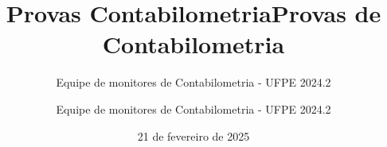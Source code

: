\documentclass[brazilian,a4paper,article,12pt]{memoir}
\title{Provas Contabilometria}
\author{Equipe de monitores de Contabilometria - UFPE 2024.2}
\date{21 de fevereiro de 2025}
\title{Provas de Contabilometria}
\author{Equipe de monitores de Contabilometria - UFPE 2024.2}
\begin{document}
\frontmatter
\begin{titlingpage}
\maketitle
\end{titlingpage}

\setlrmarginsandblock{3cm}{2cm}{*}
\setulmarginsandblock{3cm}{2cm}{*}
\checkandfixthelayout

\mainmatter


\end{document}
